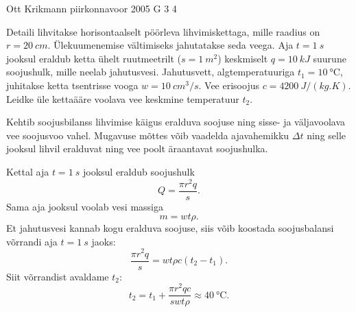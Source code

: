 {Ott Krikmann} %
{piirkonnavoor} %
{2005} %
{G 3} %
{4} %
{
\ifStatement
Detaili lihvitakse horisontaalselt pöörleva lihvimiskettaga, mille raadius on $r = \SI{20}{cm}$. Ülekuumenemise vältimiseks jahutatakse seda veega. Aja $t = \SI{1}{s}$ jooksul eraldub ketta ühelt ruutmeetrilt ($s = \SI{1}{m^2}$) keskmiselt $q = \SI{10}{kJ}$ suurune soojushulk, mille neelab jahutusvesi. Jahutusvett, algtemperatuuriga $t_1 = \SI{10}{\celsius}$, juhitakse ketta tsentrisse vooga $w = \SI{10}{cm^3/s}$. Vee erisoojus $c = \SI{4200}{J/(kg.K)}$. Leidke üle kettaääre voolava vee keskmine temperatuur $t_2$.
\fi


\ifHint
Kehtib soojusbilanss lihvimise käigus eralduva soojuse ning sisse- ja väljavoolava vee soojusvoo vahel. Mugavuse mõttes võib vaadelda ajavahemikku $\Delta t$ ning selle jooksul lihvil eralduvat ning vee poolt äraantavat soojushulka.
\fi


\ifSolution
Kettal aja $t = \SI{1}{s}$ jooksul eraldub soojushulk
\[
Q = \frac{\pi r^2 q}{s}.
\]
Sama aja jooksul voolab vesi massiga
\[
m = wt\rho.
\]
Et jahutusvesi kannab kogu eralduva soojuse, siis võib koostada soojusbalansi võrrandi aja $t = \SI{1}{s}$ jaoks:
\[
\frac{\pi r^{2} q}{s}=w t \rho c\left(t_{2}-t_{1}\right).
\]
Siit võrrandist avaldame $t_2$:
\[
t_2 = t_1 + \frac{\pi r^2qc}{swt\rho} \approx \SI{40}{\celsius}.
\]
\fi
}
